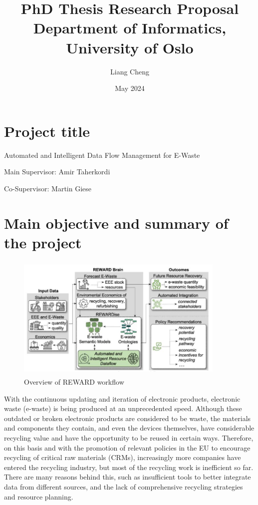 \documentclass{article}
\title{PhD Thesis Research Proposal \\ Department of Informatics, University of Oslo}
\author{Liang Cheng}
\date{May 2024}
\numberwithin{equation}{section}
\begin{document}
\maketitle
\section{Project title}
Automated and Intelligent Data Flow Management for E-Waste 

Main Supervisor: Amir Taherkordi 

Co-Supervisor: Martin Giese

\section{Main objective and summary of the project}
\begin{figure}[h]
\centering
\includegraphics[height=6cm,width=10cm]{overview.png}
\caption{Overview of REWARD workflow} \label{fig:overview}
\end{figure}
With the continuous updating and iteration of electronic products, electronic waste (e-waste) is being produced at an unprecedented speed. Although these outdated or broken electronic products are considered to be waste, the materials and components they contain, and even the devices themselves, have considerable recycling value and have the opportunity to be reused in certain ways. Therefore, on this basis and with the promotion of relevant policies in the EU to encourage recycling of critical raw materials (CRMs), increasingly more companies have entered the recycling industry, but most of the recycling work is inefficient so far. There are many reasons behind this, such as insufficient tools to better integrate data from different sources, and the lack of comprehensive recycling strategies and resource planning.
\end{document}
